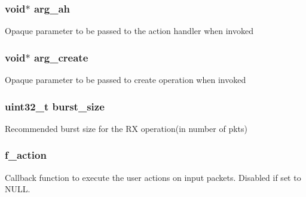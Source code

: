 \subsubsection[{arg\+\_\+ah}]{\setlength{\rightskip}{0pt plus 5cm}void$\ast$ arg\+\_\+ah}\label{structrte__pipeline__port__in__params_adfcedab79c75f0129bd5382cf3d48b13}
Opaque parameter to be passed to the action handler when invoked \hypertarget{structrte__pipeline__port__in__params_ab34a217f23d1f5a27ae00e3fbbba445c}{}
\subsubsection[{arg\+\_\+create}]{\setlength{\rightskip}{0pt plus 5cm}void$\ast$ arg\+\_\+create}\label{structrte__pipeline__port__in__params_ab34a217f23d1f5a27ae00e3fbbba445c}
Opaque parameter to be passed to create operation when invoked \hypertarget{structrte__pipeline__port__in__params_a39c7ba8da6420cf650de391a0ccb43b1}{}
\subsubsection[{burst\+\_\+size}]{\setlength{\rightskip}{0pt plus 5cm}uint32\+\_\+t burst\+\_\+size}\label{structrte__pipeline__port__in__params_a39c7ba8da6420cf650de391a0ccb43b1}
Recommended burst size for the R\+X operation(in number of pkts) \hypertarget{structrte__pipeline__port__in__params_a2022419304fcae7f13851d3cb0f99a96}{}
\subsubsection[{f\+\_\+action}]{ f\+\_\+action}\label{structrte__pipeline__port__in__params_a2022419304fcae7f13851d3cb0f99a96}
Callback function to execute the user actions on input packets. Disabled if set to N\+U\+L\+L. \hypertarget{structrte__pipeline__port__in__params_ad8c92480b58ad5e6b7917c16b5ea7b3d}{}
